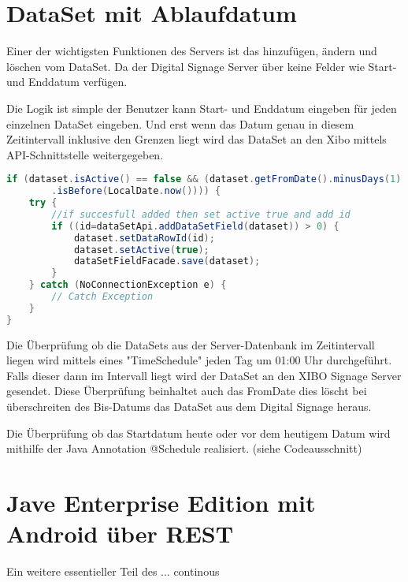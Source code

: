 \section{DataSet mit Ablaufdatum}\label{sec:datasetexpiredate}
Einer der wichtigsten Funktionen des Servers ist das hinzufügen, ändern und löschen vom DataSet. Da der Digital Signage Server über keine Felder wie Start- und Enddatum verfügen.

Die Logik ist simple der Benutzer kann Start- und Enddatum eingeben für jeden einzelnen DataSet eingeben. Und erst wenn das Datum genau in diesem Zeitintervall inklusive den Grenzen liegt wird das DataSet an den Xibo mittels API-Schnittstelle weitergegeben. 

\begin{lstlisting}[language=Java, caption={public void doCheckEvery24Hours()}]
if (dataset.isActive() == false && (dataset.getFromDate().minusDays(1)
        .isBefore(LocalDate.now()))) {
    try {
        //if succesfull added then set active true and add id
        if ((id=dataSetApi.addDataSetField(dataset)) > 0) {
            dataset.setDataRowId(id);
            dataset.setActive(true);
            dataSetFieldFacade.save(dataset);
        }
    } catch (NoConnectionException e) {
        // Catch Exception
    }
}
\end{lstlisting}

Die Überprüfung ob die DataSets aus der Server-Datenbank im Zeitintervall liegen wird mittels eines "TimeSchedule" jeden Tag um 01:00 Uhr durchgeführt. Falls dieser dann im Intervall liegt wird der DataSet an den XIBO Signage Server gesendet. Diese Überprüfung beinhaltet auch das FromDate dies löscht bei überschreiten des Bis-Datums das DataSet aus dem Digital Signage heraus. 

Die Überprüfung ob das Startdatum heute oder vor dem heutigem Datum wird mithilfe der Java Annotation @Schedule realisiert. (siehe Codeausschnitt) 

\section{Jave Enterprise Edition mit Android über REST}\label{sec:javaeeandroidrest}
Ein weitere essentieller Teil des ... continous